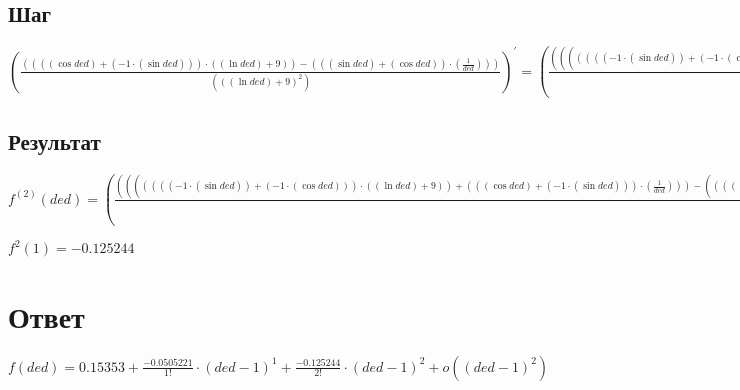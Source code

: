 \documentclass[12pt, letterpaper]{report}
\begin{document}
\subsection{Шаг}
\begin{center} $(\frac{({({({(\cos{ded})}+{({-1}\cdot{(\sin{ded})})})}\cdot{({(\ln{ded})}+{9})})}-{({({(\sin{ded})}+{(\cos{ded})})}\cdot{(\frac{1}{ded})})})}{({({(\ln{ded})}+{9})}^{2})})^{\prime} = (\frac{({({({({({({({-1}\cdot{(\sin{ded})})}+{({-1}\cdot{(\cos{ded})})})}\cdot{({(\ln{ded})}+{9})})}+{({({(\cos{ded})}+{({-1}\cdot{(\sin{ded})})})}\cdot{(\frac{1}{ded})})})}-{({({({(\cos{ded})}+{({-1}\cdot{(\sin{ded})})})}\cdot{(\frac{1}{ded})})}+{({({(\sin{ded})}+{(\cos{ded})})}\cdot{(\frac{-1}{({ded}^{2})})})})})}\cdot{({({(\ln{ded})}+{9})}^{2})})}-{({({({({(\cos{ded})}+{({-1}\cdot{(\sin{ded})})})}\cdot{({(\ln{ded})}+{9})})}-{({({(\sin{ded})}+{(\cos{ded})})}\cdot{(\frac{1}{ded})})})}\cdot{({({2}\cdot{({(\ln{ded})}+{9})})}\cdot{(\frac{1}{ded})})})})}{({({({(\ln{ded})}+{9})}^{2})}^{2})})$ \end{center} 

\subsection{Результат}
\begin{center} $f^{(2)}(ded) = (\frac{({({({({({({({-1}\cdot{(\sin{ded})})}+{({-1}\cdot{(\cos{ded})})})}\cdot{({(\ln{ded})}+{9})})}+{({({(\cos{ded})}+{({-1}\cdot{(\sin{ded})})})}\cdot{(\frac{1}{ded})})})}-{({({({(\cos{ded})}+{({-1}\cdot{(\sin{ded})})})}\cdot{(\frac{1}{ded})})}+{({({(\sin{ded})}+{(\cos{ded})})}\cdot{(\frac{-1}{({ded}^{2})})})})})}\cdot{({({(\ln{ded})}+{9})}^{2})})}-{({({({({(\cos{ded})}+{({-1}\cdot{(\sin{ded})})})}\cdot{({(\ln{ded})}+{9})})}-{({({(\sin{ded})}+{(\cos{ded})})}\cdot{(\frac{1}{ded})})})}\cdot{({({2}\cdot{({(\ln{ded})}+{9})})}\cdot{(\frac{1}{ded})})})})}{({({({(\ln{ded})}+{9})}^{2})}^{2})})$ \end{center} 
\begin{center} $f^{2}(1) = -0.125244$ \end{center}
\section{Ответ}
\begin{center} $f(ded) = 0.15353 + \frac{-0.0505221}{1!}\cdot(ded - 1)^{1} + \frac{-0.125244}{2!}\cdot(ded - 1)^{2} + o((ded - 1)^{2})$ \end{center}
\end{document}
